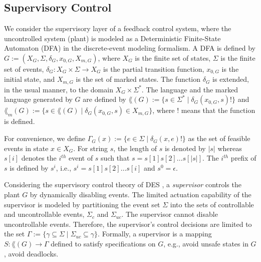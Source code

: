 \subsection{Supervisory Control}\label{subsect:des}
We consider the supervisory layer of a feedback control system, where the uncontrolled system (plant) is modeled as a Deterministic Finite-State Automaton (DFA) in the discrete-event modeling formalism.
A DFA is defined by $G := (X_G,\Sigma,\delta_G,x_{0,G},X_{m,G})$, where $X_G$ is the finite set of states, $\Sigma$ is the finite set of events, $\delta_G:X_G\times\Sigma\rightarrow X_G$ is the partial transition function, $x_{0,G}$ is the initial state, and $X_{m,G}$ is the set of marked states.
The function $\delta_G$ is extended, in the usual manner, to the domain $X_G\times\Sigma^*$. 
The language and the marked language generated by $G$ are defined by $\lang(G) := \{s \in \Sigma^*\mid \delta_G(x_{0,G},s)!\}$ and $\lang_m(G) := \{s \in \lang(G)\mid \delta_G(x_{0,G},s)\in X_{m,G}\}$, where $!$ means that the function is defined.

For convenience, we define $\Gamma_G(x) := \{e\in\Sigma\mid\delta_G(x,e)!\}$ as the set of feasible events in state $x\in X_G$.
For string $s$, the length of $s$ is denoted by $|s|$ whereas $s[i]$ denotes the $i^{th}$ event of $s$ such that $s = s[1]s[2]\ldots s[|s|]$.
The $i^{th}$ prefix of $s$ is defined by $s^i$, i.e., $s^i = s[1]s[2]\ldots s[i]$ and $s^0 = \epsilon$. 

Considering the supervisory control theory of DES \citep{Ramadge:1987}, a \emph{supervisor} controls the plant $G$ by dynamically disabling events.
The limited actuation capability of the supervisor is modeled by partitioning the event set $\Sigma$ into the sets of controllable and uncontrollable events, $\Sigma_{c}$ and $\Sigma_{uc}$.
The supervisor cannot disable uncontrollable events. 
Therefore, the supervisor's control decisions are limited to the set $\Gamma:=\{\gamma\subseteq\Sigma\mid\Sigma_{uc} \subseteq \gamma\}$.
Formally, a supervisor is a mapping $S:\lang(G)\rightarrow\Gamma$ defined to satisfy specifications on $G$, e.g., avoid unsafe states in $G$, avoid deadlocks.

